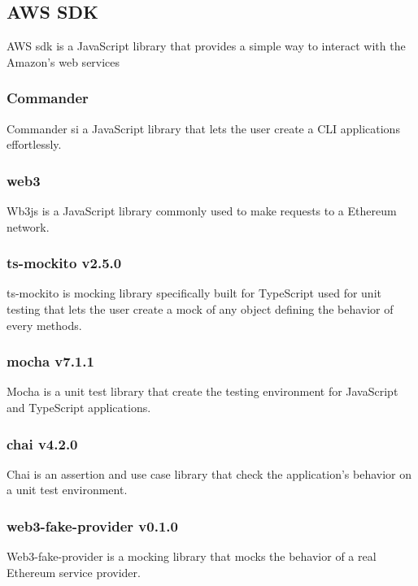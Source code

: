 \subsection{AWS SDK}
AWS sdk is a JavaScript library that provides a simple way to interact with the Amazon’s web services

\subsubsection{Commander}
Commander si a JavaScript library that lets the user create a CLI applications effortlessly.

\subsubsection{web3}
Wb3js is a JavaScript library commonly used to make requests to a Ethereum network.

\subsubsection{ts-mockito v2.5.0}
ts-mockito is mocking library specifically built for TypeScript used for unit testing that lets the user create a mock of any object defining the behavior of every methods.

\subsubsection{mocha v7.1.1}
Mocha is a unit test library that create the testing environment for JavaScript and TypeScript applications.

\subsubsection{chai v4.2.0}
Chai is an assertion and use case library that check the application's behavior on a unit test environment.

\subsubsection{web3-fake-provider v0.1.0}
Web3-fake-provider is a mocking library that mocks the behavior of a real Ethereum service provider.

